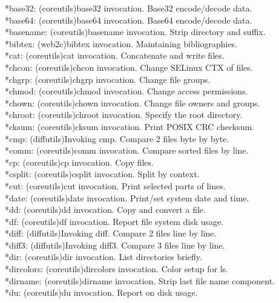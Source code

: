 \documentclass[11pt]{article}
\begin{document}
*base32: (coreutils)base32 invocation. Base32 encode/decode data.\\
*base64: (coreutils)base64 invocation. Base64 encode/decode data.\\
*basename: (coreutils)basename invocation. Strip directory and suffix.\\
*bibtex: (web2c)bibtex invocation. Maintaining bibliographies.\\
*cat: (coreutils)cat invocation. Concatenate and write files.\\
*chcon: (coreutils)chcon invocation. Change SELinux CTX of files.\\
*chgrp: (coreutils)chgrp invocation. Change file groups.\\
*chmod: (coreutils)chmod invocation. Change access permissions.\\
*chown: (coreutils)chown invocation. Change file owners and groups.\\
*chroot: (coreutils)chroot invocation. Specify the root directory.\\
*cksum: (coreutils)cksum invocation. Print POSIX CRC checksum.\\
*cmp: (diffutils)Invoking cmp. Compare 2 files byte by byte.\\
*comm: (coreutils)comm invocation. Compare sorted files by line.\\
*cp: (coreutils)cp invocation. Copy files.\\
*csplit: (coreutils)csplit invocation. Split by context.\\
*cut: (coreutils)cut invocation. Print selected parts of lines.\\
*date: (coreutils)date invocation. Print/set system date and time.\\
*dd: (coreutils)dd invocation. Copy and convert a file.\\
*df: (coreutils)df invocation. Report file system disk usage.\\
*diff: (diffutils)Invoking diff. Compare 2 files line by line.\\
*diff3: (diffutils)Invoking diff3. Compare 3 files line by line.\\
*dir: (coreutils)dir invocation. List directories briefly.\\
*dircolors: (coreutils)dircolors invocation. Color setup for ls.\\
*dirname: (coreutils)dirname invocation. Strip last file name
component.\\
*du: (coreutils)du invocation. Report on disk usage.\\
\end{document}
